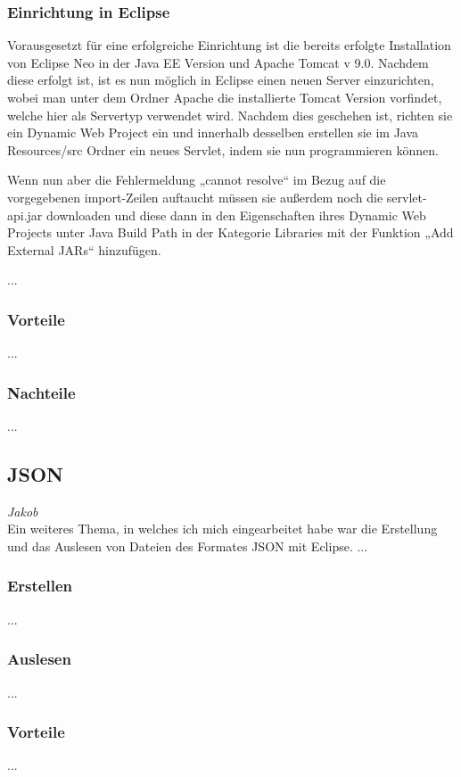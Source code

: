 \documentclass[12pt,a4paper,bibliography=totocnumbered,listof=totocnumbered]{scrartcl}
\begin{document}
\subsubsection{Einrichtung in Eclipse}
Vorausgesetzt für eine erfolgreiche Einrichtung ist die bereits erfolgte Installation von Eclipse Neo in der Java EE Version und Apache Tomcat v 9.0. 
Nachdem  diese erfolgt ist, ist es nun möglich in Eclipse einen neuen Server einzurichten, wobei man unter dem Ordner Apache die installierte Tomcat Version vorfindet, welche hier  als Servertyp verwendet wird.
Nachdem dies geschehen ist, richten sie ein Dynamic Web Project ein und innerhalb desselben erstellen sie im Java Resources/src  Ordner ein neues Servlet, indem sie nun programmieren können.

Wenn nun aber die Fehlermeldung  „cannot resolve“ im Bezug auf die vorgegebenen import-Zeilen auftaucht müssen sie außerdem noch die servlet-api.jar downloaden und diese dann in den Eigenschaften ihres Dynamic Web Projects unter Java Build Path in der Kategorie Libraries mit der Funktion „Add External JARs“ hinzufügen. 

...

\subsubsection{Vorteile}
...

\subsubsection{Nachteile}
...

\subsection{JSON}
\emph{Jakob}\\
Ein weiteres Thema, in welches ich mich eingearbeitet habe war die Erstellung und das Auslesen von Dateien
des Formates JSON mit Eclipse.
...

\subsubsection{Erstellen}
...

\subsubsection{Auslesen}
...

\subsubsection{Vorteile}
...
\end{document}
